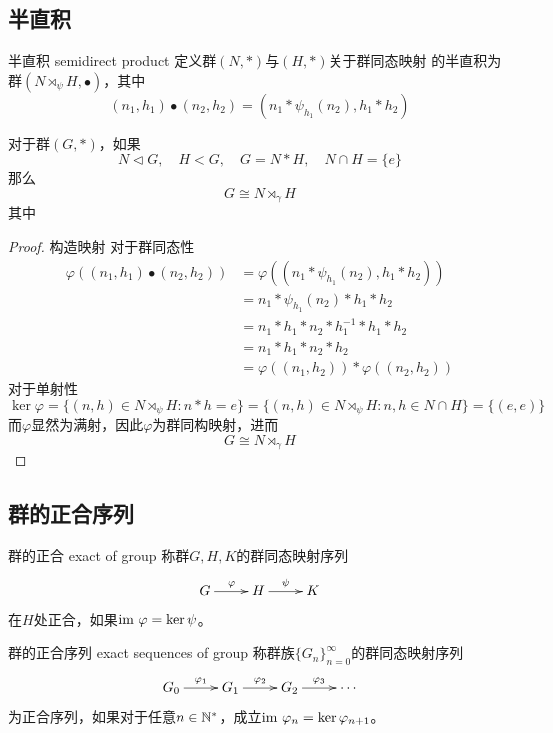 \subsection{半直积}

\begin{definition}{半直积 semidirect product}
	定义群$(N,*)$与$(H,*)$关于群同态映射
	的半直积为群$(N\rtimes_\psi H,\bullet)$，其中
	$$
	(n_1,h_1)\bullet (n_2,h_2)=(n_1*\psi_{h_1}(n_2),h_1*h_2)
	$$
\end{definition}

\begin{proposition}
	对于群$(G,*)$，如果
	$$
	N\lhd G,\quad H<G,\quad G=N*H,\quad N\cap H=\{e\}
	$$
	那么
	$$
	G\cong N\rtimes_\gamma H
	$$
	其中
\end{proposition}

\begin{proof}
	构造映射
	对于群同态性
	\begin{align*}
		\varphi((n_1,h_1)\bullet (n_2,h_2))
		& = \varphi((n_1*\psi_{h_1}(n_2),h_1*h_2))\\
		& = n_1*\psi_{h_1}(n_2)*h_1*h_2\\
		& = n_1*h_1*n_2*h_1^{-1}*h_1*h_2\\
		& = n_1*h_1*n_2*h_2\\
		& = \varphi((n_1,h_2))*\varphi((n_2,h_2))
	\end{align*}
	对于单射性
	$$
	\ker\varphi=\{ (n,h)\in N\rtimes_\psi H:n*h=e \}=\{ (n,h)\in N\rtimes_\psi H:n,h\in N\cap H \}=\{(e,e)\}
	$$
	而$\varphi$显然为满射，因此$\varphi$为群同构映射，进而
	$$
	G\cong N\rtimes_\gamma H
	$$
\end{proof}

\subsection{群的正合序列}

\begin{definition}{群的正合 exact of group}
	称群$G,H,K$的群同态映射序列
	$$
	\xymatrix{
	G\ar[r]^{\varphi} & H\ar[r]^{\psi} & K
	}
	$$
	在$H$处正合，如果$\text{im } \varphi=\ker\psi$。
\end{definition}

\begin{definition}{群的正合序列 exact sequences of group}
	称群族$\{G_n\}_{n=0}^{\infty}$的群同态映射序列
	$$
	\xymatrix{
		G_0\ar[r]^{\varphi_1} & G_1\ar[r]^{\varphi_2} & G_2\ar[r]^{\varphi_3} & \cdots
	}
	$$
	为正合序列，如果对于任意$n\in\mathbb{N}^*$，成立$\text{im } \varphi_n=\ker\varphi_{n+1}$。
\end{definition}

